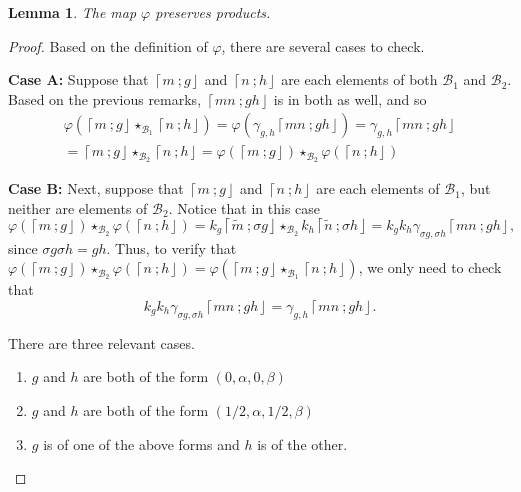 \documentclass[10pt, letterpaper]{amsart}
\newtheorem{lem}[thm]{Lemma}
\theoremstyle{remark}
\newcommand{\sB}{\mathscr{B}}
\newcommand{\fjrw}[2]{ \left\lceil #1 \:; #2 \right\rfloor }
\DeclareMathOperator{\Hess}{Hess}
\DeclareMathOperator{\Fix}{Fix}
\begin{document}
\begin{lem} The map $\varphi$ preserves products.
\end{lem}
  
\begin{proof}
Based on the definition of $\varphi$, there are several cases to check. 

\noindent \textbf{Case A:} Suppose that $\fjrw{m}{g}$ and $\fjrw{n}{h}$ are each elements of both $\sB_1$
and $\sB_2$. Based on the previous remarks, $\fjrw{mn}{gh}$ is in both as well, and so 
\[
\begin{array}{l}
\varphi(\fjrw{m}{g} \star_{\sB_1} \fjrw{n}{h}) = \varphi( \gamma_{g,h} \fjrw{mn}{gh}) = \gamma_{g,h} \fjrw{mn}{gh} \\
=
\fjrw{m}{g} \star_{\sB_2} \fjrw{n}{h}=\varphi(\fjrw{m}{g}) \star_{\sB_2} \varphi(\fjrw{n}{h})
\end{array}
\]

\noindent \textbf{Case B:} Next, suppose that $\fjrw{m}{g}$ and $\fjrw{n}{h}$ are each elements of $\sB_1$, but neither are elements of $\sB_2$.   
Notice that in this case 
\[
\varphi(\fjrw{m}{g}) \star_{\sB_2} \varphi(\fjrw{ n}{ h})=k_g\fjrw{\tilde m}{\sigma g} \star_{\sB_2} k_h\fjrw{\tilde n}{\sigma h} = k_gk_h\gamma_{\sigma g, \sigma h} \fjrw{mn}{ gh},
\]
since $\sigma g \sigma h = gh$.  %
Thus, to verify that  
$
\varphi(\fjrw{m}{ g}) \star_{\sB_2}  \varphi( \fjrw{n}{ h}) =\varphi(\fjrw{m}{ g} \star_{\sB_1}   \fjrw{n}{ h})$, %
we only need to check that 
\[
k_gk_h\gamma_{\sigma g, \sigma h} \fjrw{mn}{gh}= \gamma_{g, h} \fjrw{mn}{ gh}.
\]


There are three relevant cases. 
\begin{enumerate}
\item $g$ and $h$ are both of the form $(0, \alpha, 0, \beta)$
\item $g$ and $h$ are both of the form $(1/2, \alpha, 1/2, \beta)$
\item $g$ is of one of the above forms and $h$ is of the other.
\end{enumerate}


\end{proof}
\end{document}
